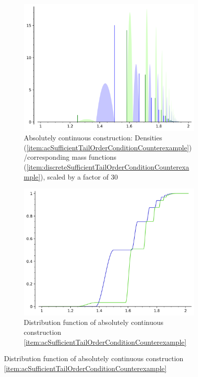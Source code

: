 \documentclass[a4paper]{scrreprt}
\begin{document}
\begin{ex}
\begin{enumerate}
\begin{figure}
                \vspace*{0.01\textwidth}
                \begin{subfigure}[t]{0.49\textwidth}
                    \includegraphics[width=\textwidth]{Pictures/ac-densities-masses.png}
                    \caption{Absolutely continuous construction: Densities (\ref{item:acSufficientTailOrderConditionCounterexample})/corresponding mass functions (\ref{item:discreteSufficientTailOrderConditionCounterexample}), scaled by a factor of 30}
                    \label{fig:acCounterexample-masses-densities}
                \end{subfigure}
                \begin{subfigure}[t]{0.49\textwidth}
                    \includegraphics[width=\textwidth]{Pictures/ac-distribution.png}
                    \caption{Distribution function of absolutely continuous construction \ref{item:acSufficientTailOrderConditionCounterexample}}
                    \label{fig:acCounterexample-distribution}
                \end{subfigure}
                

\end{figure}
\end{enumerate}
\end{ex}
\end{document}
